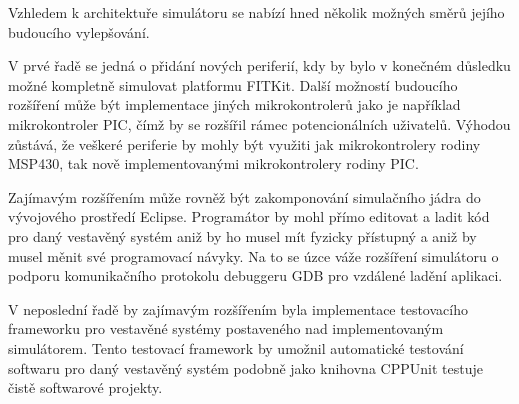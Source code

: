 Vzhledem k architektuře simulátoru se nabízí hned několik možných směrů jejího budoucího vylepšování.

V prvé řadě se jedná o přidání nových periferií, kdy by bylo v konečném důsledku možné kompletně simulovat platformu FITKit. Další možností budoucího rozšíření může být implementace jiných mikrokontrolerů jako je například mikrokontroler PIC, čímž by se rozšířil rámec potencionálních uživatelů. Výhodou zůstává, že veškeré periferie by mohly být využiti jak mikrokontrolery rodiny MSP430, tak nově implementovanými mikrokontrolery rodiny PIC.

Zajímavým rozšířením může rovněž být zakomponování simulačního jádra do vývojového prostředí Eclipse. Programátor by mohl přímo editovat a ladit kód pro daný vestavěný systém aniž by ho musel mít fyzicky přístupný a aniž by musel měnit své programovací návyky. Na to se úzce váže rozšíření simulátoru o podporu komunikačního protokolu debuggeru GDB pro vzdálené ladění aplikaci.

V neposlední řadě by zajímavým rozšířením byla implementace testovacího frameworku pro vestavěné systémy postaveného nad implementovaným simulátorem. Tento testovací framework by umožnil automatické testování softwaru pro daný vestavěný systém podobně jako knihovna CPPUnit testuje čistě softwarové projekty.



